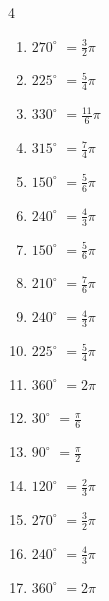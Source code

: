 \begin{multicols}{4}
\begin{enumerate}
  \item $\displaystyle 270^{\circ}$
        $\displaystyle =\frac{3}{2}\pi$

  \item $\displaystyle 225^{\circ}$
        $\displaystyle =\frac{5}{4}\pi$

  \item $\displaystyle 330^{\circ}$
        $\displaystyle =\frac{11}{6}\pi$

  \item $\displaystyle 315^{\circ}$
        $\displaystyle =\frac{7}{4}\pi$

  \item $\displaystyle 150^{\circ}$
        $\displaystyle =\frac{5}{6}\pi$

  \item $\displaystyle 240^{\circ}$
        $\displaystyle =\frac{4}{3}\pi$

  \item $\displaystyle 150^{\circ}$
        $\displaystyle =\frac{5}{6}\pi$

  \item $\displaystyle 210^{\circ}$
        $\displaystyle =\frac{7}{6}\pi$

  \item $\displaystyle 240^{\circ}$
        $\displaystyle =\frac{4}{3}\pi$

  \item $\displaystyle 225^{\circ}$
        $\displaystyle =\frac{5}{4}\pi$

  \item $\displaystyle 360^{\circ}$
        $\displaystyle =2\pi$

  \item $\displaystyle 30^{\circ}$
        $\displaystyle =\frac{\pi}{6}$

  \item $\displaystyle 90^{\circ}$
        $\displaystyle =\frac{\pi}{2}$

  \item $\displaystyle 120^{\circ}$
        $\displaystyle =\frac{2}{3}\pi$

  \item $\displaystyle 270^{\circ}$
        $\displaystyle =\frac{3}{2}\pi$

  \item $\displaystyle 240^{\circ}$
        $\displaystyle =\frac{4}{3}\pi$

  \item $\displaystyle 360^{\circ}$
        $\displaystyle =2\pi$


\end{enumerate}
\end{multicols}
